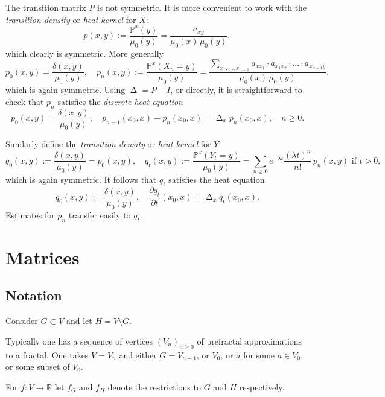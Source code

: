\documentclass[a4paper]{amsart}
\theoremstyle{plain}
\theoremstyle{definition}
\theoremstyle{remark}
\DeclareMathOperator{\lap}{\Delta}
\begin{document}
\medskip The transition matrix $ P $ is not symmetric.  It is more convenient to work with the   \emph{transition \underline{density}} or \emph{heat kernel} for $ X  $:
\[
p(x,y) := \frac{\mathbb{P}  ^x(y)}{\mu_0(y)} = \frac{a_{xy}} { \mu_0(x)\, \mu_0(y)},
\]
which clearly is symmetric.  More generally
\[
p_0(x,y) = \frac{\delta (x,y)}{\mu_0(y)}, \quad 
p_n(x,y) := \frac{\mathbb{P}  ^x(X_n=y)}{\mu_0(y)} = \frac{\sum_{x_1, \dots , x_{n-1}} a_{x x_1}\cdot a_{x_1x_2} \cdot \ldots \cdot  a_{x_{n-1}y}} { \mu_0(x)\, \mu_0(y)},
\]
which is again symmetric.
Using $ \lap = P - I $, or directly, it is straightforward  to check that $ p_n  $ satisfies the \emph{discrete heat equation}
\[
p_0(x,y) = \frac{\delta (x,y)}{\mu_0(y)}, \quad p_{n+1}(x_0,x) - p_n(x_0,x) = \lap_x p_n(x_0,x) , \quad n\geq 0 .
\]

\medskip
Similarly define the  \emph{transition \underline{density}} or \emph{heat kernel} for $ Y  $:
\[
q_0(x,y) := \frac{\delta (x,y)}{\mu_0(y)} = p_0(x,y), \quad 
q_t(x,y)  :=  \frac{\mathbb{P}  ^x(Y_t = y)}{\mu_0(y)}  
   = \sum_{n \geq 0 } e^{-\lambda  t } \frac{(\lambda  t)^n}{n!}\, p_n(x,y)  \text{ if }t >0,
 \]
which is again symmetric.  
It follows that $ q_t $ satisfies the heat equation
\[ 
q_0(x,y) := \frac{\delta (x,y)}{\mu_0(y)} , \quad \frac{\partial q_t}{\partial t}(x_0,x) = \lap_x q_t(x_0,x).
\]  
Estimates for $ p_n $ transfer easily to $ q_t $.



  


\section{\textbf{Matrices}}



\subsection{Notation} Consider   $ G\subset V $ and let $ H = V \setminus G $.

Typically one has a sequence of vertices $ (V_n)_{n\geq 0 } $ of prefractal approximations    to a fractal.  One takes $ V=V_{n} $ and either $ G = V_{n-1} $, or $  V_0 $, or $ a $ for some $ a\in V_0 $, or some subset of $ V_0 $.
 
For $ f:V\to \mathbb{R} $ let $ f_G $ and $ f_H $ denote the restrictions to $G $ and  $ H $ respectively.
\end{document}
